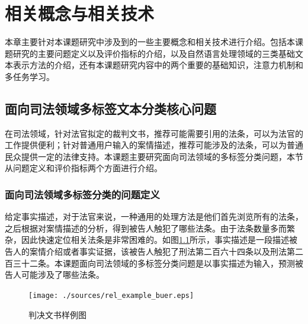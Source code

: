 
\chapter{相关概念与相关技术}
本章主要针对本课题研究中涉及到的一些主要概念和相关技术进行介绍。包括本课题研究的主要问题定义以及评价指标的介绍，以及自然语言处理领域的三类基础文本表示方法的介绍，还有本课题研究内容中的两个重要的基础知识，注意力机制和多任务学习。
\section{面向司法领域多标签文本分类核心问题}
在司法领域，针对法官拟定的裁判文书，推荐可能需要引用的法条，可以为法官的工作提供便利；针对普通用户输入的案情描述，推荐可能涉及的法条，可以为普通民众提供一定的法律支持。本课题主要研究面向司法领域的多标签分类问题，本节从问题定义和评价指标两个方面进行介绍。
\subsection{面向司法领域多标签分类的问题定义}


给定事实描述，对于法官来说，一种通用的处理方法是他们首先浏览所有的法条，之后根据对案情描述的分析，得到被告人触犯了哪些法条。由于法条数量多而繁杂，因此快速定位相关法条是非常困难的。如图\ref{fig:example}所示，事实描述是一段描述被告人的案情介绍或者事实证据，该被告人触犯了刑法第二百六十四条以及刑法第二百三十二条。本课题面向司法领域的多标签分类问题是以事实描述为输入，预测被告人可能涉及了哪些法条。

\begin{figure}[htb]
    \centering
    \texttt{[image: ./sources/rel\_example\_buer.eps]}
    \vspace{-10pt}
    \caption{\label{fig:example} 判决文书样例图}
    \vspace{-5pt}
\end{figure}


